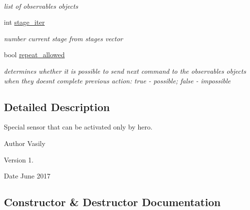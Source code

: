 \begin{DoxyCompactItemize}
$$\begin{DoxyCompactList}\small\item\em list of observables objects \end{DoxyCompactList}\item 
\mbox{\label{class_lever_a0a44f2d62a5ebc3bb5ae4aaed55076fb}} 
int \hyperlink{class_lever_a0a44f2d62a5ebc3bb5ae4aaed55076fb}{stage\+\_\+iter}
\begin{DoxyCompactList}\small\item\em number current stage from stages vector \end{DoxyCompactList}\item 
\mbox{\label{class_lever_a8c464b1b28d5978e48bc3bc85a8cb67d}} 
bool \hyperlink{class_lever_a8c464b1b28d5978e48bc3bc85a8cb67d}{repeat\+\_\+allowed}
\begin{DoxyCompactList}\small\item\em determines whether it is possible to send next command to the observables objects when they doesn\textquotesingle{}t complete previous action\+: \textquotesingle{}true\textquotesingle{} -\/ possible; \textquotesingle{}false\textquotesingle{} -\/ impossible \end{DoxyCompactList}\end{DoxyCompactItemize}


\subsection{Detailed Description}
Special sensor that can be activated only by hero. 

\begin{DoxyAuthor}{Author}
Vasily 
\end{DoxyAuthor}
\begin{DoxyVersion}{Version}
1. 
\end{DoxyVersion}
\begin{DoxyDate}{Date}
June 2017 
\end{DoxyDate}


\subsection{Constructor \& Destructor Documentation}
\mbox{\label{class_lever_a2b4dd6cea65837c09711dda3d02d7cae}} 
